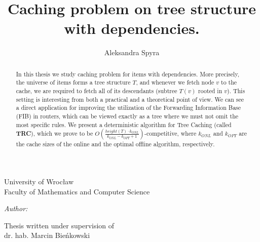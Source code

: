 \documentclass[a4paper,11pt]{article}
\title{Caching problem on tree structure with dependencies.}
\author{Aleksandra Spyra}
\makeatletter
\newcommand{\linia}{\rule{\linewidth}{0.4mm}}
\renewcommand{\maketitle}{
\begin{titlepage}
    \vspace*{1cm}
    \begin{center}
        \small
        University of Wroc\l{}aw\\
        Faculty of Mathematics and Computer Science
    \end{center}
    \vspace{3cm}
    \noindent%
    \begin{center}
        \LARGE \textsc{\@title}
    \end{center}
    \vspace{1cm}
    \begin{center}
        \textit{\small Author:}\\
        \normalsize \textsc{\@author} \par
        \vspace{5cm}
    \end{center}
    \begin{flushright}    
        {\small Thesis written under supervision of}\\
             dr. hab. Marcin Bie\'{n}kowski
    \end{flushright}
    \vspace*{\stretch{6}}
    \begin{center}
        \@date
    \end{center}
\end{titlepage}
\setcounter{page}{2}
}
\makeatother
\begin{document}
\maketitle

\begin{abstract}
In this thesis we study caching problem for items with dependencies.
More precisely, the universe of items forms a tree structure $T$, and whenever
we fetch node $v$ to the cache, we are required to fetch all of its descendants
(subtree $T(v)$ rooted in $v$). This setting is interesting from both a practical 
and a theoretical point of view. We can see a direct application for improving 
the utilization of the Forwarding Information Base (FIB) in routers, which can be 
viewed exactly as a tree where we must not omit the most specific rules. We 
present a deterministic algorithm for Tree Caching (called \textbf{TRC}), which 
we 
prove to be $O(\frac{height(T) \cdot k_{ONL}}{k_{ONL} - k_{OPT} + 
1})$-competitive, 
where $k_{ONL}$ and $k_{OPT}$ are the cache sizes of the online and the optimal offline 
algorithm, respectively. 
\end{abstract}

\tableofcontents




\printbibliography[maxnames=10]
\end{document}
